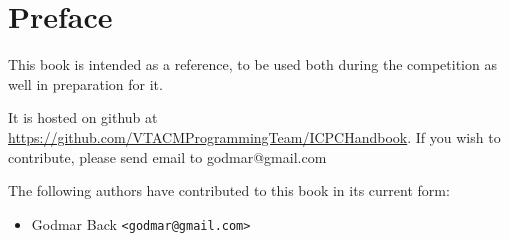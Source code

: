 \chapter{Preface}

This book is intended as a reference, to be used both during the competition as well
in preparation for it.

It is hosted on github at
\href{https://github.com/VTACMProgrammingTeam/ICPCHandbook}{https://github.com/VTACMProgrammingTeam/ICPCHandbook}.
If you wish to contribute, please send email to godmar@gmail.com

The following authors have contributed to this book in its current form:
\begin{itemize}
    \item Godmar Back \texttt{<godmar@gmail.com>}
\end{itemize}
